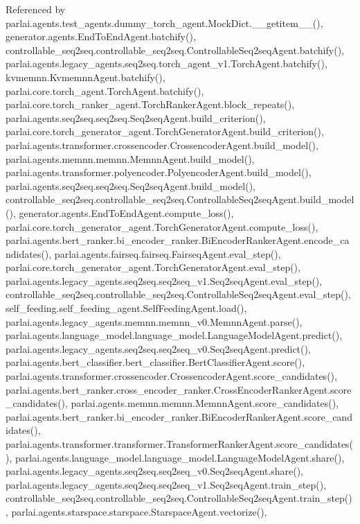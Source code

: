 Referenced by parlai.\+agents.\+test\+\_\+agents.\+dummy\+\_\+torch\+\_\+agent.\+Mock\+Dict.\+\_\+\+\_\+getitem\+\_\+\+\_\+(), generator.\+agents.\+End\+To\+End\+Agent.\+batchify(), controllable\+\_\+seq2seq.\+controllable\+\_\+seq2seq.\+Controllable\+Seq2seq\+Agent.\+batchify(), parlai.\+agents.\+legacy\+\_\+agents.\+seq2seq.\+torch\+\_\+agent\+\_\+v1.\+Torch\+Agent.\+batchify(), kvmemnn.\+Kvmemnn\+Agent.\+batchify(), parlai.\+core.\+torch\+\_\+agent.\+Torch\+Agent.\+batchify(), parlai.\+core.\+torch\+\_\+ranker\+\_\+agent.\+Torch\+Ranker\+Agent.\+block\+\_\+repeats(), parlai.\+agents.\+seq2seq.\+seq2seq.\+Seq2seq\+Agent.\+build\+\_\+criterion(), parlai.\+core.\+torch\+\_\+generator\+\_\+agent.\+Torch\+Generator\+Agent.\+build\+\_\+criterion(), parlai.\+agents.\+transformer.\+crossencoder.\+Crossencoder\+Agent.\+build\+\_\+model(), parlai.\+agents.\+memnn.\+memnn.\+Memnn\+Agent.\+build\+\_\+model(), parlai.\+agents.\+transformer.\+polyencoder.\+Polyencoder\+Agent.\+build\+\_\+model(), parlai.\+agents.\+seq2seq.\+seq2seq.\+Seq2seq\+Agent.\+build\+\_\+model(), controllable\+\_\+seq2seq.\+controllable\+\_\+seq2seq.\+Controllable\+Seq2seq\+Agent.\+build\+\_\+model(), generator.\+agents.\+End\+To\+End\+Agent.\+compute\+\_\+loss(), parlai.\+core.\+torch\+\_\+generator\+\_\+agent.\+Torch\+Generator\+Agent.\+compute\+\_\+loss(), parlai.\+agents.\+bert\+\_\+ranker.\+bi\+\_\+encoder\+\_\+ranker.\+Bi\+Encoder\+Ranker\+Agent.\+encode\+\_\+candidates(), parlai.\+agents.\+fairseq.\+fairseq.\+Fairseq\+Agent.\+eval\+\_\+step(), parlai.\+core.\+torch\+\_\+generator\+\_\+agent.\+Torch\+Generator\+Agent.\+eval\+\_\+step(), parlai.\+agents.\+legacy\+\_\+agents.\+seq2seq.\+seq2seq\+\_\+v1.\+Seq2seq\+Agent.\+eval\+\_\+step(), controllable\+\_\+seq2seq.\+controllable\+\_\+seq2seq.\+Controllable\+Seq2seq\+Agent.\+eval\+\_\+step(), self\+\_\+feeding.\+self\+\_\+feeding\+\_\+agent.\+Self\+Feeding\+Agent.\+load(), parlai.\+agents.\+legacy\+\_\+agents.\+memnn.\+memnn\+\_\+v0.\+Memnn\+Agent.\+parse(), parlai.\+agents.\+language\+\_\+model.\+language\+\_\+model.\+Language\+Model\+Agent.\+predict(), parlai.\+agents.\+legacy\+\_\+agents.\+seq2seq.\+seq2seq\+\_\+v0.\+Seq2seq\+Agent.\+predict(), parlai.\+agents.\+bert\+\_\+classifier.\+bert\+\_\+classifier.\+Bert\+Classifier\+Agent.\+score(), parlai.\+agents.\+transformer.\+crossencoder.\+Crossencoder\+Agent.\+score\+\_\+candidates(), parlai.\+agents.\+bert\+\_\+ranker.\+cross\+\_\+encoder\+\_\+ranker.\+Cross\+Encoder\+Ranker\+Agent.\+score\+\_\+candidates(), parlai.\+agents.\+memnn.\+memnn.\+Memnn\+Agent.\+score\+\_\+candidates(), parlai.\+agents.\+bert\+\_\+ranker.\+bi\+\_\+encoder\+\_\+ranker.\+Bi\+Encoder\+Ranker\+Agent.\+score\+\_\+candidates(), parlai.\+agents.\+transformer.\+transformer.\+Transformer\+Ranker\+Agent.\+score\+\_\+candidates(), parlai.\+agents.\+language\+\_\+model.\+language\+\_\+model.\+Language\+Model\+Agent.\+share(), parlai.\+agents.\+legacy\+\_\+agents.\+seq2seq.\+seq2seq\+\_\+v0.\+Seq2seq\+Agent.\+share(), parlai.\+agents.\+legacy\+\_\+agents.\+seq2seq.\+seq2seq\+\_\+v1.\+Seq2seq\+Agent.\+train\+\_\+step(), controllable\+\_\+seq2seq.\+controllable\+\_\+seq2seq.\+Controllable\+Seq2seq\+Agent.\+train\+\_\+step(), parlai.\+agents.\+starspace.\+starspace.\+Starspace\+Agent.\+vectorize(), 